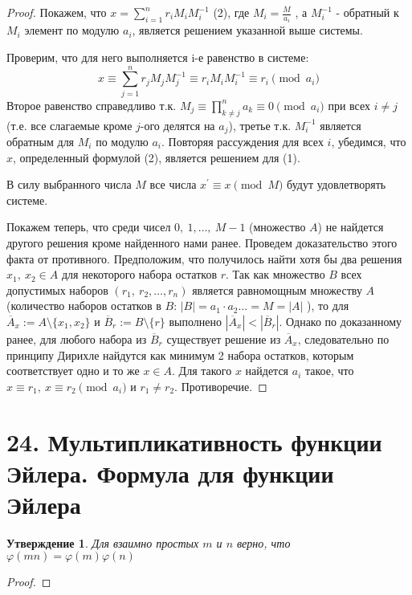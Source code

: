 \documentclass[a4paper,12pt]{article}
\newtheorem*{Statements}{Утверждение}
\renewcommand{\phi}{\varphi}
\newcommand{\p}{^{\prime}}
\begin{document}
        \begin{proof}
            Покажем, что $ x=\sum _{i=1}^{n}r_{i}M_{i}M_{i}^{-1}$ (2), 
            где $ M_{i}={\frac {M}{a_{i}}}$ , а $ M_{i}^{-1} $  - обратный к $ M_{i}$  элемент по модулю $a_{i}$, является решением указанной выше системы.

            Проверим, что для него выполняется i-е равенство в системе: 
            $$ x\equiv \sum _{j=1}^{n} r_{j} M_{j} M_{j}^{-1}
                \equiv r_{i}M_{i} M_{i}^{-1}
                \equiv r_{i}{\pmod {a_{i}}} $$
            Второе равенство справедливо т.к.
            $ M_{j}\equiv \prod_{k\neq j}^{n} a_{k}
                    \equiv 0{\pmod {a_{i}}}$ 
            при всех $ i\neq j$ (т.е. все слагаемые кроме $j$-ого делятся на $a_j$), третье т.к. $ M_{i}^{-1} $ является обратным для $ M_{i} $ по модулю $a_{i} $. Повторяя рассуждения для всех $i$, убедимся, что $x$, определенный формулой (2), является решением для (1).

            В силу выбранного числа $M$ все числа $x\p\equiv x{\pmod  M}$ будут удовлетворять системе.

            Покажем теперь, что среди чисел $0,\ 1, \dots,\ M-1$ (множество $A$) не найдется другого решения кроме найденного нами ранее. 
            Проведем доказательство этого факта от противного. 
            Предположим, что получилось найти хотя бы два решения $x_{1},\ x_{2}\in A$ для некоторого набора остатков $r$. Так как множество $B$ всех допустимых наборов 
            $ (r_{1},\ r_{2},\dots ,r_{n}) $ является равномощным множеству $ A $ (количество наборов остатков в $B$: $|B| = a_1 \cdot a_2 \ldots = M = |A|$ ), 
            то для $\overline A_{x}:=A\setminus \{x_{1},x_{2}\} $ 
            и 
            $ \overline B_{r}:=B\setminus \{r\}$ выполнено 
            $|\overline A_{x}|<|\overline B_{r}|$. Однако по доказанному ранее, 
            для любого набора из $ \overline B_{r} $ существует решение из $ \overline A_{x}$, следовательно по принципу Дирихле найдутся как минимум 2 набора остатков, которым соответствует одно и то же $x\in A$. Для такого $ x $ найдется $ a_{i} $ такое, что 
            $x\equiv r_{1},\ x\equiv r_{2}{\pmod  {a_{i}}}$ и $r_{1}\neq r_{2}$. Противоречие.

        \end{proof}

        \section*{24. Мультипликативность функции Эйлера. Формула для функции Эйлера}
        \begin{Statements}
            Для взаимно простых $m$ и $n$ верно, что $\phi(mn) = \phi(m)\phi(n)$
        \end{Statements}
        \begin{proof}

        \end{proof}
\end{document}
